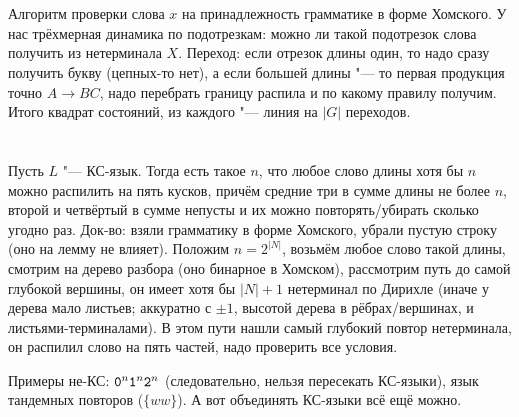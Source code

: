 \section{} %
	Алгоритм проверки слова $x$ на принадлежность грамматике в форме Хомского.
	У нас трёхмерная динамика по подотрезкам: можно ли такой подотрезок слова получить из нетерминала $X$.
	Переход: если отрезок длины один, то надо сразу получить букву (цепных-то нет), а если большей длины "--- то первая
	продукция точно $A \to BC$, надо перебрать границу распила и по какому правилу получим.
	Итого квадрат состояний, из каждого "--- линия на $|G|$ переходов.

\section{} %
	Пусть $L$ "--- КС-язык.
	Тогда есть такое $n$, что любое слово длины хотя бы $n$ можно распилить на пять кусков,
	причём средние три в сумме длины не более $n$, второй и четвёртый в сумме непусты и их можно
	повторять/убирать сколько угодно раз.
	Док-во: взяли грамматику в форме Хомского, убрали пустую строку (оно на лемму не влияет).
	Положим $n=2^{|N|}$, возьмём любое слово такой длины, смотрим на дерево разбора (оно бинарное в Хомском),
	рассмотрим путь до самой глубокой вершины, он имеет хотя бы $|N|+1$ нетерминал по Дирихле (иначе у дерева мало листьев; аккуратно с $\pm1$,
	высотой дерева в рёбрах/вершинах, и листьями-терминалами).
	В этом пути нашли самый глубокий повтор нетерминала, он распилил слово на пять частей, надо проверить все условия.

	Примеры не-КС: $\t{0}^n\t{1}^n\t{2}^n$ (следовательно, нельзя пересекать КС-языки), язык тандемных повторов ($\{ww\}$).
	А вот объединять КС-языки всё ещё можно.
